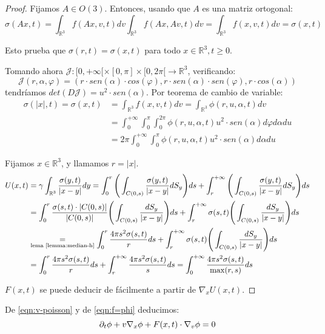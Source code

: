 \documentclass[a4paper,10pt]{scrartcl}
\theoremstyle{definition}
\numberwithin{equation}{section}
\begin{document}
\begin{proof}
Fijamos $A \in O(3)$. Entonces, usando que $A$ es una matriz ortogonal:
 \[
 \sigma(Ax,t) = \int_{\mathbb{R}^3} f(Ax,v,t) dv \int_{\mathbb{R}^3} f(Ax,Av,t) dv = \int_{\mathbb{R}^3} f(x,v,t) dv = \sigma(x,t)
 \]
 
 Esto prueba que $\sigma(r,t) = \sigma(x,t)$ para todo $x\in \mathbb{R}^3, t\ge 0$.
 
 Tomando ahora $\mathcal{J}:[0,+\infty[ \times [0,\pi] \times [0,2\pi[ \rightarrow \mathbb{R}^3$, verificando:
 \[\mathcal{J}(r,\alpha, \varphi) = (r\cdot sen(\alpha) \cdot cos(\varphi), r\cdot sen(\alpha) \cdot sen(\varphi), r\cdot cos(\alpha))\]
 tendríamos $det(D\mathcal{J}) = u^2 \cdot sen(\alpha)$. Por teorema de cambio de variable: 
 \begin{align*}
  \sigma(|x|,t) = \sigma(x,t) &= \int_{\mathbb{R}^3} f(x,v,t) dv = \int_{\mathbb{R}^3} \phi(r,u,\alpha,t) dv \\
  &= \int_0^{+\infty} \int_0^\pi \int_0^{2\pi} \phi(r,u,\alpha,t) u^2 \cdot sen(\alpha) d\varphi d\alpha du \\
  &= 2\pi \int_0^{+\infty} \int_0^\pi \phi(r,u,\alpha,t) u^2 \cdot sen(\alpha) d\alpha du
 \end{align*}
 
 Fijamos $x\in \mathbb{R}^3$, y llamamos $r=|x|$.
 \begin{align*}
 U(x,t) &= \gamma \int_{\mathbb{R}^3} \frac{\sigma(y,t)}{|x-y|} dy = \int_0^r \Bigg(\int_{C(0,s)} \frac{\sigma(y,t)}{|x-y|} dS_y\Bigg)ds + 
 \int_r^{+\infty} \Bigg(\int_{C(0,s)} \frac{\sigma(y,t)}{|x-y|} dS_y\Bigg)ds \\
 &= \int_0^r \frac{\sigma(s,t)\cdot |C(0,s)|}{|C(0,s)|} \Bigg(\int_{C(0,s)} \frac{dS_y}{|x-y|}\Bigg) ds + \int_r^{+\infty} \sigma(s,t) \Bigg(\int_{C(0,s)} \frac{dS_y}{|x-y|}\Bigg) ds \\
 &\underset{\textrm{lema \ref{lemma:median-h}}}{=} \int_0^r \frac{4\pi s^2 \sigma(s,t)}{r} ds + 
 \int_r^{+\infty} \sigma(s,t) \Bigg(\int_{C(0,s)} \frac{dS_y}{|x-y|} \Bigg) ds \\
 &= \int_0^r \frac{4\pi s^2 \sigma(s,t)}{r} ds + 
 \int_r^{+\infty} \frac{4\pi s^2 \sigma(s,t)}{s} ds = \int_0^{+\infty} \frac{4\pi s^2 \sigma(s,t)}{\max(r,s)} ds
 \end{align*}
 
 $F(x,t)$ se puede deducir de fácilmente a partir de $\nabla_x U(x,t)$.
\end{proof}

De \eqref{eqn:v-poisson} y de \eqref{eqn:f=phi} deducimos:
\[
\partial_t \phi + v \nabla_x \phi + F(x,t) \cdot \nabla_v \phi = 0\\
\]
\end{document}
